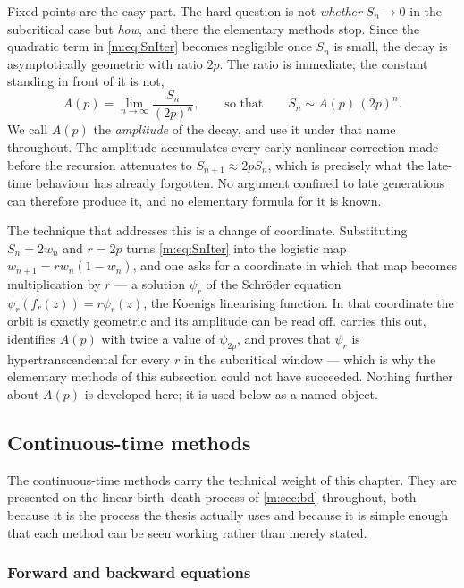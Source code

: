 Fixed points are the easy part. The hard question is not \emph{whether} $S_n\to0$
in the subcritical case but \emph{how}, and there the elementary methods stop.
Since the quadratic term in \cref{m:eq:SnIter} becomes negligible once $S_n$ is
small, the decay is asymptotically geometric with ratio $2p$. The ratio is
immediate; the constant standing in front of it is not,
\begin{equation}
\label{m:eq:Apdef}
A(p) = \lim_{n\to\infty}\frac{S_n}{(2p)^n},
\qquad\text{so that}\qquad
S_n\sim A(p)\,(2p)^n .
\end{equation}
We call $A(p)$ the \emph{amplitude} of the decay, and use it under that name
throughout. The amplitude accumulates every early nonlinear correction made before
the recursion attenuates to $S_{n+1}\approx2pS_n$, which is precisely what the
late-time behaviour has already forgotten. No argument confined to late generations
can therefore produce it, and no elementary formula for it is known.

The technique that addresses this is a change of coordinate. Substituting
$S_n=2w_n$ and $r=2p$ turns \cref{m:eq:SnIter} into the logistic map
$w_{n+1}=rw_n(1-w_n)$, and one asks for a coordinate in which that map becomes
multiplication by $r$ --- a solution $\psi_r$ of the Schröder equation
$\psi_r(f_r(z))=r\psi_r(z)$, the Koenigs linearising function. In that coordinate
the orbit is exactly geometric and its amplitude can be read off. \ChAcap{} carries
this out, identifies $A(p)$ with twice a value of $\psi_{2p}$, and proves that
$\psi_r$ is hypertranscendental for every $r$ in the subcritical window --- which
is why the elementary methods of this subsection could not have succeeded. Nothing
further about $A(p)$ is developed here; it is used below as a named object.

\subsection{Continuous-time methods}
\label{m:sec:ctmethods}

The continuous-time methods carry the technical weight of this chapter. They are
presented on the linear birth--death process of \cref{m:sec:bd} throughout, both
because it is the process the thesis actually uses and because it is simple enough
that each method can be seen working rather than merely stated.

\subsubsection{Forward and backward equations}
\label{m:sec:backward}

